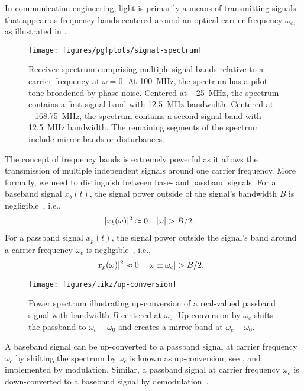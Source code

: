 In communication engineering, light is primarily a means of transmitting signals that appear as frequency bands centered around an optical carrier frequency $\omega_c$, as illustrated in .
\begin{figure}[ht]
	\centering
	\texttt{[image: figures/pgfplots/signal-spectrum]}
	\caption{Receiver spectrum comprising multiple signal bands relative to a carrier frequency at $\omega=0$. At \SI{+100}{\mega\hertz}, the spectrum has a pilot tone broadened by phase noise. Centered at \SI{-25}{\mega\hertz}, the spectrum contains a first signal band with \SI{12.5}{\mega\hertz} bandwidth. Centered at \SI{-168.75}{\mega\hertz}, the spectrum contains a second signal band with \SI{12.5}{\mega\hertz} bandwidth. The remaining segments of the spectrum include mirror bands or disturbances.}\label{fig:signal_spectrum}
\end{figure}
The concept of frequency bands is extremely powerful as it allows the transmission of multiple independent signals around one carrier frequency.
More formally, we need to distinguish between base- and passband signals.
For a baseband signal $x_b(t)$, the signal power outside of the signal's bandwidth $B$ is negligible~\cite[p.~15]{Madhow2008}, i.e.,
\begin{align}
	\lvert x_b(\omega)\rvert^2
	&\approx
	0
	&
	\lvert\omega\rvert
	&>
	B/2
	.
\end{align}
For a passband signal $x_p(t)$, the signal power outside the signal's band around a carrier frequency $\omega_c$ is negligible~\cite[p.~16]{Madhow2008}, i.e.,
\begin{align}
	\lvert x_p(\omega)\rvert^2
	&\approx
	0
	&
	\lvert\omega\pm\omega_c\rvert
	&>
	B/2
	.	
\end{align}
\begin{figure}[ht]
	\centering
	\texttt{[image: figures/tikz/up-conversion]}
	\caption{Power spectrum illustrating up-conversion of a real-valued passband signal with bandwidth $B$ centered at $\omega_0$. Up-conversion by $\omega_c$ shifts the passband to $\omega_c+\omega_0$ and creates a mirror band at $\omega_c-\omega_0$.}\label{fig:up_conversion}
\end{figure}
A baseband signal can be up-converted to a passband signal at carrier frequency $\omega_c$ by shifting the spectrum by $\omega_c$ is known as up-conversion, see , and implemented by modulation.
Similar, a passband signal at carrier frequency $\omega_c$ is down-converted to a baseband signal by demodulation~\cite[p.~26]{Madhow2008}.


